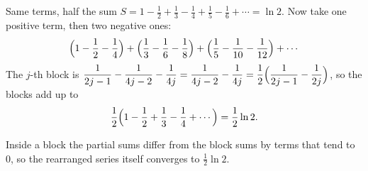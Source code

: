 \documentclass{wosm-slides}
\begin{document}
\begin{frame}{Same terms, half the sum}
  $S = 1 - \frac12 + \frac13 - \frac14 + \frac15 - \frac16 + \cdots = \ln 2$.
  Now take one positive term, then two negative ones:
  \[ \Bigl(1 - \frac12 - \frac14\Bigr) + \Bigl(\frac13 - \frac16 - \frac18\Bigr)
     + \Bigl(\frac15 - \frac1{10} - \frac1{12}\Bigr) + \cdots \]
  \pause
  The $j$-th block is
  $\displaystyle\frac{1}{2j-1} - \frac{1}{4j-2} - \frac{1}{4j}
   = \frac{1}{4j-2} - \frac{1}{4j} = \frac12\Bigl(\frac{1}{2j-1} - \frac{1}{2j}\Bigr)$,
  so the blocks add up to
  \[ \frac12\Bigl(1 - \frac12 + \frac13 - \frac14 + \cdots\Bigr) = \frac12 \ln 2 . \]
  \pause
  {\small Inside a block the partial sums differ from the block sums by terms that
  tend to $0$, so the rearranged series itself converges to $\frac12 \ln 2$.\par}
\end{frame}
\end{document}

